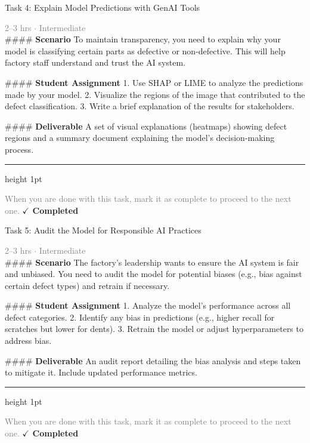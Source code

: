 \documentclass[10pt,a4paper]{article}
\begin{document}
\begin{taskbox}{Task 4: Explain Model Predictions with GenAI Tools}

    {\small \textcolor{gray}{2--3 hrs $\cdot$ Intermediate}}\\[12pt]

    \#\#\#\# \textbf{Scenario}  
To maintain transparency, you need to explain why your model is classifying certain parts as defective or non-defective. This will help factory staff understand and trust the AI system.  

\#\#\#\# \textbf{Student Assignment}  
1. Use SHAP or LIME to analyze the predictions made by your model.  
2. Visualize the regions of the image that contributed to the defect classification.  
3. Write a brief explanation of the results for stakeholders.  

\#\#\#\# \textbf{Deliverable}  
A set of visual explanations (heatmaps) showing defect regions and a summary document explaining the model’s decision-making process.\par

    \vspace{16pt}

    \textcolor{cardBorder}{\hrule height 1pt}\vspace{8pt}

    \small \textcolor{gray}{When you are done with this task, mark it as complete to proceed to the next one.} \hfill \textbf{\textcolor{brandDark}{$\checkmark$ Completed}}

\end{taskbox}

\begin{taskbox}{Task 5: Audit the Model for Responsible AI Practices}

    {\small \textcolor{gray}{2--3 hrs $\cdot$ Intermediate}}\\[12pt]

    \#\#\#\# \textbf{Scenario}  
The factory’s leadership wants to ensure the AI system is fair and unbiased. You need to audit the model for potential biases (e.g., bias against certain defect types) and retrain if necessary.  

\#\#\#\# \textbf{Student Assignment}  
1. Analyze the model’s performance across all defect categories.  
2. Identify any bias in predictions (e.g., higher recall for scratches but lower for dents).  
3. Retrain the model or adjust hyperparameters to address bias.  

\#\#\#\# \textbf{Deliverable}  
An audit report detailing the bias analysis and steps taken to mitigate it. Include updated performance metrics.\par

    \vspace{16pt}

    \textcolor{cardBorder}{\hrule height 1pt}\vspace{8pt}

    \small \textcolor{gray}{When you are done with this task, mark it as complete to proceed to the next one.} \hfill \textbf{\textcolor{brandDark}{$\checkmark$ Completed}}

\end{taskbox}
\end{document}
